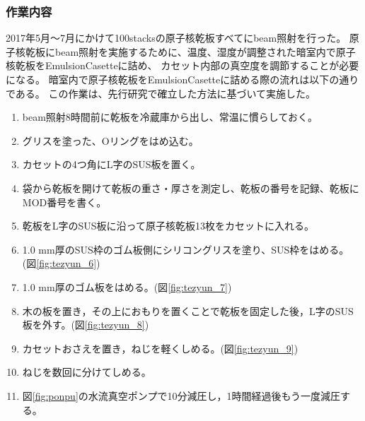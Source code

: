 \documentclass[12pt,a4paper]{jarticle}
\begin{document}
\subsubsection{作業内容}
2017年5月～7月にかけて100stacksの原子核乾板すべてにbeam照射を行った。
原子核乾板にbeam照射を実施するために、温度、湿度が調整された暗室内で原子核乾板をEmulsionCasetteに詰め、
カセット内部の真空度を調節することが必要になる。
暗室内で原子核乾板をEmulsionCasetteに詰める際の流れは以下の通りである。
この作業は、先行研究で確立した方法に基づいて実施した。\cite{endo}
\begin{enumerate}
    \item beam照射8時間前に乾板を冷蔵庫から出し、常温に慣らしておく。
    \item グリスを塗った、Oリングをはめ込む。
    \item カセットの4つ角にL字のSUS板を置く。 
    \item 袋から乾板を開けて乾板の重さ・厚さを測定し、乾板の番号を記録、乾板にMOD番号を書く。
    \item 乾板をL字のSUS板に沿って原子核乾板13枚をカセットに入れる。
    \item 1.0 mm厚のSUS枠のゴム板側にシリコングリスを塗り、SUS枠をはめる。(図\ref{fig:tezyun_6})
    \item 1.0 mm厚のゴム板をはめる。(図\ref{fig:tezyun_7})
    \item 木の板を置き，その上におもりを置くことで乾板を固定した後，L字のSUS板を外す。(図\ref{fig:tezyun_8})
    \item カセットおさえを置き，ねじを軽くしめる。(図\ref{fig:tezyun_9})
    \item ねじを数回に分けてしめる。
    \item 図\ref{fig:ponpu}の水流真空ポンプで10分減圧し，1時間経過後もう一度減圧する。
\end{enumerate}
\end{document}
